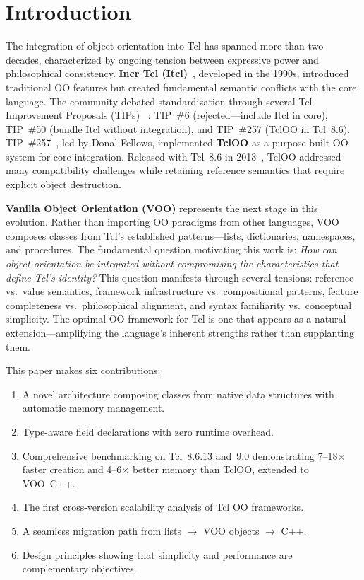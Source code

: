 \section{Introduction}

The integration of object orientation into Tcl has spanned more than two decades,
characterized by ongoing tension between expressive power and philosophical consistency.
\textbf{Incr Tcl (Itcl)}~\cite{dejong,tclwiki-itcl}, developed in the 1990s, introduced
traditional OO features but created fundamental semantic conflicts with the core language.
The community debated standardization through several Tcl Improvement Proposals (TIPs)~%
\cite{tclwiki-tip257}: TIP~\#6 (rejected---include Itcl in core), TIP~\#50 (bundle Itcl
without integration), and TIP~\#257 (TclOO in Tcl~8.6). TIP~\#257~\cite{fellows2006},
led by Donal Fellows, implemented \textbf{TclOO} as a purpose-built OO system for core
integration. Released with Tcl~8.6 in 2013~\cite{tcl86}, TclOO addressed many
compatibility challenges while retaining reference semantics that require explicit object
destruction.

\textbf{Vanilla Object Orientation (VOO)} represents the next stage in this evolution.
Rather than importing OO paradigms from other languages, VOO composes classes from Tcl's
established patterns---lists, dictionaries, namespaces, and procedures. The fundamental
question motivating this work is: \emph{How can object orientation be integrated without
compromising the characteristics that define Tcl's identity?} This question manifests
through several tensions: reference vs.\ value semantics, framework infrastructure
vs.\ compositional patterns, feature completeness vs.\ philosophical alignment, and syntax
familiarity vs.\ conceptual simplicity. The optimal OO framework for Tcl is one that
appears as a natural extension---amplifying the language's inherent strengths rather than
supplanting them.

This paper makes six contributions:
\begin{enumerate}[leftmargin=*]
  \item A novel architecture composing classes from native data structures with automatic
        memory management.
  \item Type-aware field declarations with zero runtime overhead.
  \item Comprehensive benchmarking on Tcl~8.6.13 and~9.0 demonstrating 7--18$\times$
        faster creation and 4--6$\times$ better memory than TclOO, extended to VOO~C++.
  \item The first cross-version scalability analysis of Tcl OO frameworks.
  \item A seamless migration path from lists $\to$ VOO objects $\to$ C++.
  \item Design principles showing that simplicity and performance are complementary
        objectives.
\end{enumerate}
